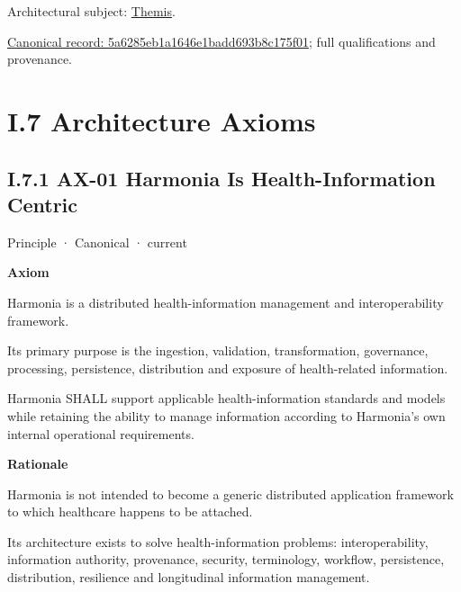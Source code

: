 Architectural subject: \hyperref[element:899d34ec491948b68aad09e507dea6d1]{Themis}.


{\footnotesize \href{../../../../continuum/motivation/constraint/5a6285eb1a1646e1badd693b8c175f01.md}{Canonical record: 5a6285eb1a1646e1badd693b8c175f01}; full qualifications and provenance.}\par
\chapter*{I.7 Architecture Axioms}
\label{navigation:I.7}

\section*{I.7.1 AX-01 Harmonia Is Health-Information Centric}
\label{navigation:I.7.1}

\label{element:e9bd61acaaea4577bc4086a5639e52c3}
{\small Principle · Canonical · current}\par

\par\medskip\textbf{Axiom}\par


Harmonia is a distributed health-information management and
interoperability framework.



Its primary purpose is the ingestion, validation, transformation,
governance, processing, persistence, distribution and exposure of
health-related information.



Harmonia SHALL support applicable health-information standards and
models while retaining the ability to manage information according to
Harmonia's own internal operational requirements.



\par\medskip\textbf{Rationale}\par


Harmonia is not intended to become a generic distributed application
framework to which healthcare happens to be attached.



Its architecture exists to solve health-information problems:
interoperability, information authority, provenance, security,
terminology, workflow, persistence, distribution, resilience and
longitudinal information management.



